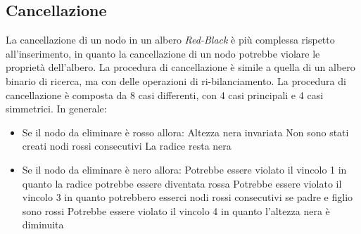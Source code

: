     \subsection{Cancellazione}
        La cancellazione di un nodo in un albero \textit{Red-Black} è più complessa rispetto all'inserimento, in quanto la cancellazione di un nodo potrebbe violare le proprietà dell'albero. La procedura di cancellazione è simile a quella di un albero binario di ricerca, ma con delle operazioni di ri-bilanciamento. La procedura di cancellazione è composta da 8 casi differenti, con 4 casi principali e 4 casi simmetrici.\newline
        In generale:
        \begin{itemize}
            \item Se il nodo da eliminare è rosso allora:
                \subitem Altezza nera invariata
                \subitem Non sono stati creati nodi rossi consecutivi
                \subitem La radice resta nera
            \item Se il nodo da eliminare è nero allora:
                \subitem Potrebbe essere violato il vincolo 1 in quanto la radice potrebbe essere diventata rossa
                \subitem Potrebbe essere violato il vincolo 3 in quanto potrebbero esserci nodi rossi consecutivi se padre e figlio sono rossi
                \subitem Potrebbe essere violato il vincolo 4 in quanto l'altezza nera è diminuita
        \end{itemize}
